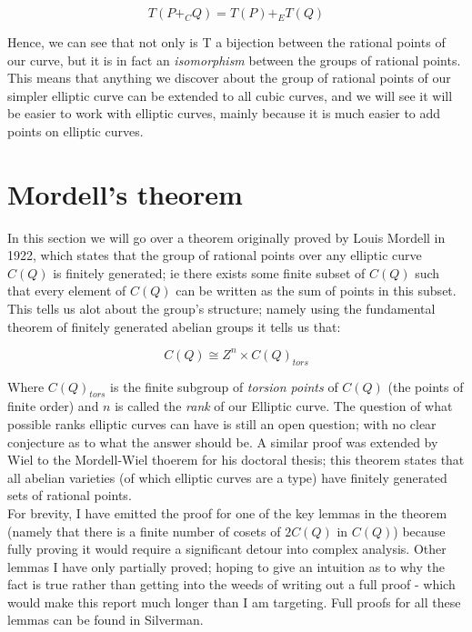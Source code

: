\documentclass{article}
\begin{document}
\[T(P +_C Q) = T(P) +_E T(Q)\]

Hence, we can see that not only is T a bijection between the rational points of our curve, but it is in fact an \emph{isomorphism} between the groups of rational points. This means that anything we discover about the group of rational points of our simpler elliptic curve can be extended to all cubic curves, and we will see it will be easier to work with elliptic curves, mainly because it is much easier to add points on elliptic curves.

\newpage


\section{Mordell's theorem}

In this section we will go over a theorem originally proved by Louis Mordell in 1922, which states that the group of rational points over any elliptic curve $C(Q)$ is finitely generated; ie there exists some finite subset of $C(Q)$ such that every element of $C(Q)$ can be written as the sum of points in this subset. This tells us alot about the group's structure; namely using the fundamental theorem of finitely generated abelian groups it tells us that:

\[C(Q) \cong Z^n \times C(Q)_{tors}\]

Where $C(Q)_{tors}$ is the finite subgroup of \emph{torsion points} of $C(Q)$ (the points of finite order) and $n$ is called the \emph{rank} of our Elliptic curve. The question of what possible ranks elliptic curves can have is still an open question; with no clear conjecture as to what the answer should be. A similar proof was extended by Wiel to the Mordell-Wiel thoerem for his doctoral thesis; this theorem states that all abelian varieties (of which elliptic curves are a type) have finitely generated sets of rational points.\\

For brevity, I have emitted the proof for one of the key lemmas in the theorem (namely that there is a finite number of cosets of $2C(Q)$ in $C(Q)$) because fully proving it would require a significant detour into complex analysis. Other lemmas I have only partially proved; hoping to give an intuition as to why the fact is true rather than getting into the weeds of writing out a full proof - which would make this report much longer than I am targeting. Full proofs for all these lemmas can be found in Silverman.\\
\end{document}
